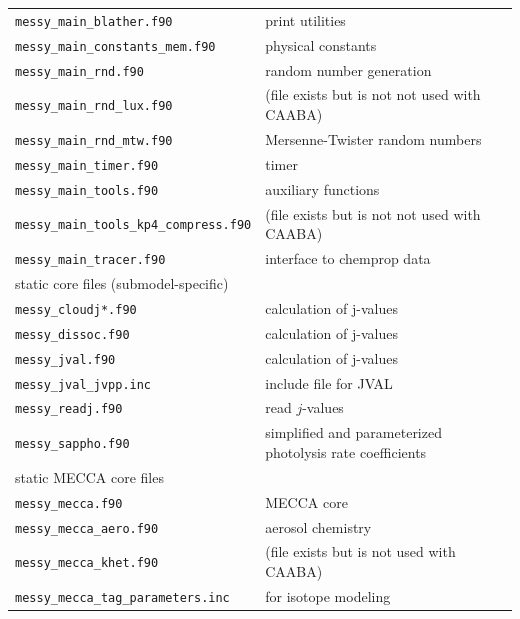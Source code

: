 \documentclass[a4paper,twoside]{article}
\newcommand{\IT}[1]{#1\index{#1}}
\begin{document}
\begin{table}
\begin{center}
\begin{tabular}{lp{}}
      \verb|messy_main_blather.f90|            & print utilities\\
      \verb|messy_main_constants_mem.f90|      & physical constants\\
      \verb|messy_main_rnd.f90|                & \IT{random number} generation\\
      \verb|messy_main_rnd_lux.f90|            & (file exists but is not not used with \IT{CAABA})\\
      \verb|messy_main_rnd_mtw.f90|            & \IT{Mersenne-Twister} \IT{random number}s\\
      \verb|messy_main_timer.f90|              & timer\\
      \verb|messy_main_tools.f90|              & auxiliary functions\\
      \verb|messy_main_tools_kp4_compress.f90| & (file exists but is not not used with \IT{CAABA})\\
      \verb|messy_main_tracer.f90|             & interface to chemprop data\\
      \hline
      \multicolumn{2}{l}{static core files (\IT{submodel}-specific)}\\
      \hline
      \verb|messy_cloudj*.f90|                 & calculation of \IT{j-values}\\
      \verb|messy_dissoc.f90|                  & calculation of \IT{j-values}\\
      \verb|messy_jval.f90|                    & calculation of \IT{j-values}\\
      \verb|messy_jval_jvpp.inc|               & include file for \IT{JVAL}\\
      \verb|messy_readj.f90|                   & read $j$-values\\
      \verb|messy_sappho.f90|                  & simplified and parameterized
                                                 \IT{photolysis} rate coefficients\\
      \hline
      \multicolumn{2}{l}{static \IT{MECCA} core files}\\
      \hline
      \verb|messy_mecca.f90|                   & \IT{MECCA} core\\
      \verb|messy_mecca_aero.f90|              & \IT{aerosol} \IT{chemistry}\\
      \verb|messy_mecca_khet.f90|              & (file exists but is not
                                                 used with \IT{CAABA})\\
      \verb|messy_mecca_tag_parameters.inc|    & for isotope modeling\\

\end{tabular}
\end{center}
\end{table}
\end{document}
